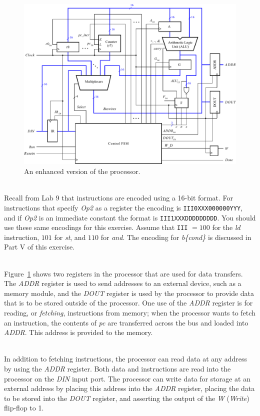 \documentclass[epsfig,10pt,fullpage]{article} \addtolength{\textwidth}{1.5in}
\begin{document}
\begin{figure}[H]
\begin{center}
\includegraphics[scale = 0.8]{figures/figure12_F.pdf}
\end{center}
\caption{An enhanced version of the processor.}
\label{fig:fig12}
\end{figure}

~\\
\noindent
Recall from Lab 9 that instructions are encoded using a 16-bit format. For instructions
that specify {\it Op2} as a register the encoding is \texttt{III0XXX000000YYY}, and if {\it Op2}
is an immediate constant the format is \texttt{III1XXXDDDDDDDDD}. You should use these 
same encodings for this exercise. Assume that \texttt{III} $= 100$ for the {\it ld} instruction,
$101$ for {\it st}, and $110$ for {\it and}. The encoding for {\it b\{cond\}} is discussed 
in Part V of this exercise.

~\\
Figure~\ref{fig:fig12} shows two registers in the processor that are used for data transfers. The 
{\it ADDR} register is used to send addresses to an external device, such as a memory module,
and the {\it DOUT} register is used by the processor to provide data that is to be stored outside 
of the processor. One use of the {\it ADDR} register is for reading, or {\it fetching}, 
instructions from memory; when the processor wants to fetch an instruction, the contents
of {\it pc} are transferred across the bus and loaded into {\it ADDR}. This address is 
provided to the memory.

~\\
In addition to fetching instructions, the processor can read data 
at any address by using the {\it ADDR} register. Both data and instructions are read into 
the processor on the {\it DIN} input port.  The processor can write data for storage at 
an external address by placing this address into the {\it ADDR} register, placing the data 
to be stored into the {\it DOUT} register, and asserting the output of the {\it W} 
({\it Write}) flip-flop to 1. 
\end{document}
